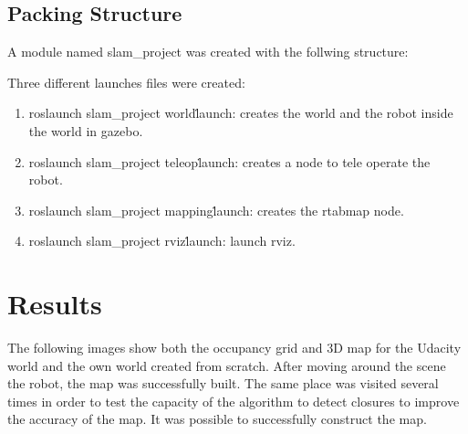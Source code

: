 \documentclass[10pt,journal,compsoc]{IEEEtran}
\begin{document}
\subsection{Packing Structure}
A module named slam\_project was created with the follwing structure:

Three different launches files were created:
\begin{enumerate}
\item roslaunch slam\_project world\.launch: creates the world and the robot inside the world in gazebo.
\item roslaunch slam\_project teleop\.launch: creates a node to tele operate the robot. 
\item roslaunch slam\_project mapping\.launch: creates the rtabmap node.
\item roslaunch slam\_project rviz\.launch: launch rviz.
\end{enumerate}

\section{Results}

The following images show both the occupancy grid and 3D map for the Udacity world and the own world created from scratch. After moving around the scene the robot, the map was successfully built. The same place was visited several times in order to test the capacity of the algorithm to detect closures to improve the accuracy of the map. It was possible to successfully construct the map. 
\end{document}
